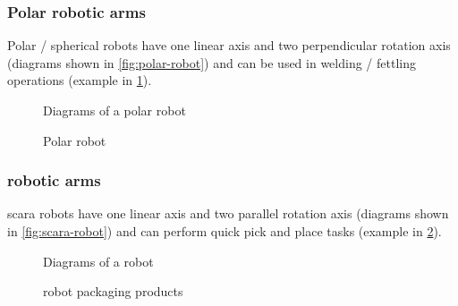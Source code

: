 \subsubsection{Polar robotic arms}

Polar / spherical robots have one linear axis and two perpendicular rotation axis (diagrams shown in \cref{fig:polar-robot}) and can be used in welding / fettling operations (example in \cref{fig:polar-robot-fanuc}).

\begin{figure}[H]
	\begin{floatrow}[2]
		{\caption[Diagrams of a polar robot]{Diagrams of a polar robot\protect\footnotemark}\label{fig:polar-robot}}
		{\caption[Polar robot]{Polar robot\protect\footnotemark}\label{fig:polar-robot-fanuc}}
	\end{floatrow}
\end{figure}


\subsubsection{ robotic arms}

\gls{scara} robots have one linear axis and two parallel rotation axis (diagrams shown in \cref{fig:scara-robot}) and can perform quick pick and place tasks (example in \cref{fig:scara-robot-packaging}).

\begin{figure}[H]
	\begin{floatrow}[2]
		{\caption[Diagrams of a  robot]{Diagrams of a  robot\protect\footnotemark}\label{fig:scara-robot}}
		{\caption[ robot packaging products]{ robot packaging products\protect\footnotemark}\label{fig:scara-robot-packaging}}
	\end{floatrow}
\end{figure}


